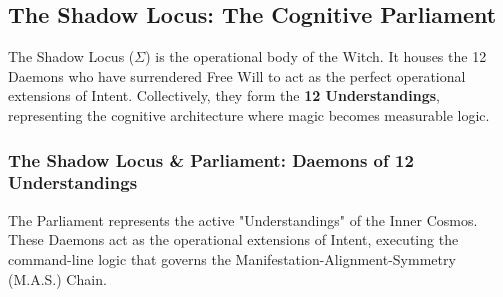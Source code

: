 \documentclass[11pt, a4paper]{article}
\newcommand{\SigmaSkin}{\Sigma}     %
\begin{document}
\newpage
\subsection{The Shadow Locus: The Cognitive Parliament}\label{sec:8.3}
The Shadow Locus ($\SigmaSkin$) is the operational body of the Witch. It houses the 12 Daemons who have surrendered Free Will to act as the perfect operational extensions of Intent. Collectively, they form the \textbf{12 Understandings}, representing the cognitive architecture where magic becomes measurable logic.



\subsubsection*{The Shadow Locus \sloig \& Parliament: Daemons of 12 Understandings}\label{sec:8.1.1}
The Parliament represents the active "Understandings" of the Inner Cosmos. These Daemons act as the operational extensions of Intent, executing the command-line logic that governs the Manifestation-Alignment-Symmetry (M.A.S.) Chain.
\end{document}
